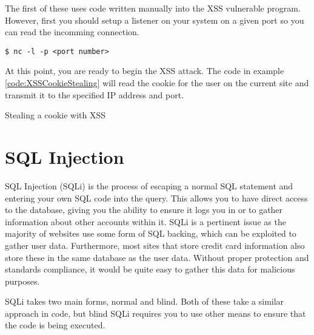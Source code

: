 				The first of these uses code written manually into the XSS vulnerable program. 
				However, first you should setup a listener on your system on a given port so you can read the incomming connection. 
				\begin{lstlisting}[style=CLI]
					$ nc -l -p <port number>
				\end{lstlisting}

				At this point, you are ready to begin the XSS attack. 
				The code in example \ref{code:XSSCookieStealing} will read the cookie for the user on the current site and transmit it to the specified IP address and port. 
				\begin{code}
					\centering
					
					\label{code:XSSCookieStealing}
					\caption{Stealing a cookie with XSS}
				\end{code}
					
	\section{SQL Injection}
		SQL Injection (SQLi) is the process of escaping a normal SQL statement and entering your own SQL code into the query. 
		This allows you to have direct access to the database, giving you the ability to ensure it logs you in or to gather information about other accounts within it. 
		SQLi is a pertinent issue as the majority of websites use some form of SQL backing, which can be exploited to gather user data. 
		Furthermore, most sites that store credit card information also store these in the same database as the user data. 
		Without proper protection and standards compliance, it would be quite easy to gather this data for malicious purposes. 

		SQLi takes two main forms, normal and blind. 
		Both of these take a similar approach in code, but blind SQLi requires you to use other means to ensure that the code is being executed. 
